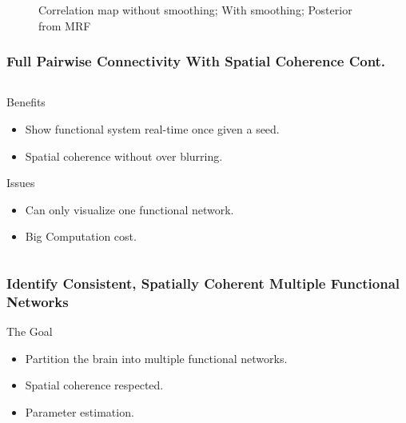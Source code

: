 \documentclass[serif]{beamer}
\begin{document}
\begin{frame}
\begin{figure}[bth]
      \caption{Correlation map without smoothing; With smoothing; Posterior from MRF}
  \end{figure}

\end{frame}
\begin{frame}
\frametitle{Full Pairwise Connectivity With Spatial Coherence Cont.}
  \begin{columns}[c]
    \begin{column}{10cm}
      \begin{block}{Benefits}
        \begin{itemize}
        \item Show functional system real-time once given a seed.
        \item Spatial coherence without over blurring.
        \end{itemize}
      \end{block}
        
      \begin{block}{Issues}
        \begin{itemize}
        \item Can only visualize one functional network.
        \item Big Computation cost.
        \end{itemize}
      \end{block}
    \end{column}

    \end{columns}
\end{frame}
\begin{frame}
\frametitle{Identify Consistent, Spatially Coherent Multiple Functional Networks~\cite{liu2011monteCopy} }
\begin{block}{The Goal}
  \begin{itemize}
  \item Partition the brain into multiple functional networks.
  \item Spatial coherence respected.
  \item Parameter estimation.
  \end{itemize}
\end{block}
\end{frame}
\end{document}
